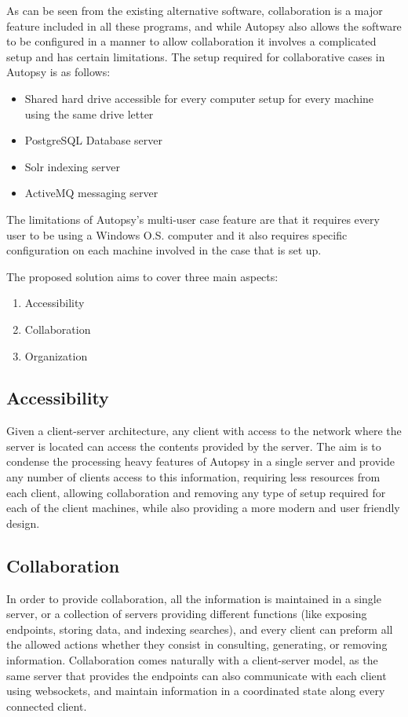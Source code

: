 As can be seen from the existing alternative software, collaboration is a major feature included in all these programs, and while Autopsy also allows the software to be
configured in a manner to allow collaboration it involves a complicated setup and has certain limitations.
The setup required for collaborative cases in Autopsy is as follows:
\begin{itemize}
 \item Shared hard drive accessible for every computer setup for every machine using the same drive letter
 \item PostgreSQL Database server 
 \item Solr indexing server
 \item ActiveMQ messaging server
\end{itemize}
The limitations of Autopsy's multi-user case feature are that it requires every user to be using a Windows O.S. computer and it also requires specific configuration on each
machine involved in the case that is set up.

The proposed solution aims to cover three main aspects:
\begin{enumerate}
 \item Accessibility
 \item Collaboration
 \item Organization 
\end{enumerate}

\subsection{Accessibility}

Given a client-server architecture, any client with access to the network where the server is located can access the contents provided by the server.
The aim is to condense the processing heavy features of Autopsy in a single server and provide any number of clients access to this information, requiring less 
resources from each client, allowing collaboration and removing any type of setup required for each of the client machines, while also providing a more modern 
and user friendly design.

\subsection{Collaboration}

In order to provide collaboration, all the information is maintained in a single server, or a collection of servers providing different functions (like exposing endpoints,
storing data, and indexing searches), and every client can preform all the allowed actions whether they consist in consulting, generating, or removing information. 
Collaboration comes naturally with a client-server model, as the same server that provides the endpoints can also communicate with each client using websockets, and maintain 
information in a coordinated state along every connected client.

